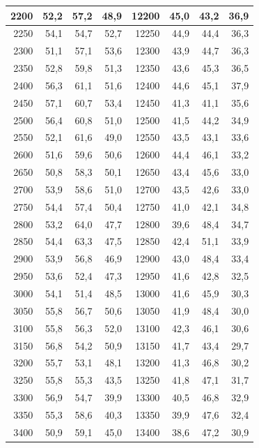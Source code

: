 \begin{small}
\begin{longtable}{|r|r|r|r|r|r|r|r|}
2200 & 52,2 & 57,2 & 48,9 & 12200 & 45,0 & 43,2 & 36,9 \\ \hline
2250 & 54,1 & 54,7 & 52,7 & 12250 & 44,9 & 44,4 & 36,3 \\ \hline
2300 & 51,1 & 57,1 & 53,6 & 12300 & 43,9 & 44,7 & 36,3 \\ \hline
2350 & 52,8 & 59,8 & 51,3 & 12350 & 43,6 & 45,3 & 36,5 \\ \hline
2400 & 56,3 & 61,1 & 51,6 & 12400 & 44,6 & 45,1 & 37,9 \\ \hline
2450 & 57,1 & 60,7 & 53,4 & 12450 & 41,3 & 41,1 & 35,6 \\ \hline
2500 & 56,4 & 60,8 & 51,0 & 12500 & 41,5 & 44,2 & 34,9 \\ \hline
2550 & 52,1 & 61,6 & 49,0 & 12550 & 43,5 & 43,1 & 33,6 \\ \hline
2600 & 51,6 & 59,6 & 50,6 & 12600 & 44,4 & 46,1 & 33,2 \\ \hline
2650 & 50,8 & 58,3 & 50,1 & 12650 & 43,4 & 45,6 & 33,0 \\ \hline
2700 & 53,9 & 58,6 & 51,0 & 12700 & 43,5 & 42,6 & 33,0 \\ \hline
2750 & 54,4 & 57,4 & 50,4 & 12750 & 41,0 & 42,1 & 34,8 \\ \hline
2800 & 53,2 & 64,0 & 47,7 & 12800 & 39,6 & 48,4 & 34,7 \\ \hline
2850 & 54,4 & 63,3 & 47,5 & 12850 & 42,4 & 51,1 & 33,9 \\ \hline
2900 & 53,9 & 56,8 & 46,9 & 12900 & 43,0 & 48,4 & 33,4 \\ \hline
2950 & 53,6 & 52,4 & 47,3 & 12950 & 41,6 & 42,8 & 32,5 \\ \hline
3000 & 54,1 & 51,4 & 48,5 & 13000 & 41,6 & 45,9 & 30,3 \\ \hline
3050 & 55,8 & 56,7 & 50,6 & 13050 & 41,9 & 48,4 & 30,0 \\ \hline
3100 & 55,8 & 56,3 & 52,0 & 13100 & 42,3 & 46,1 & 30,6 \\ \hline
3150 & 56,8 & 54,2 & 50,9 & 13150 & 41,7 & 43,4 & 29,7 \\ \hline
3200 & 55,7 & 53,1 & 48,1 & 13200 & 41,3 & 46,8 & 30,2 \\ \hline
3250 & 55,8 & 55,3 & 43,5 & 13250 & 41,8 & 47,1 & 31,7 \\ \hline
3300 & 56,9 & 54,7 & 39,9 & 13300 & 40,5 & 46,8 & 32,9 \\ \hline
3350 & 55,3 & 58,6 & 40,3 & 13350 & 39,9 & 47,6 & 32,4 \\ \hline
3400 & 50,9 & 59,1 & 45,0 & 13400 & 38,6 & 47,2 & 30,9 \\ \hline

\end{longtable}
\end{small}
